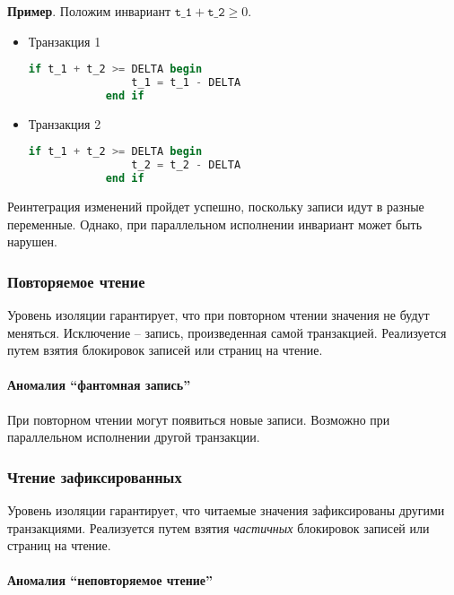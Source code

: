 \textbf{Пример}. Положим инвариант $\texttt{t\_1} + \texttt{t\_2} \geq 0$.

\begin{itemize}
    \item Транзакция 1
        \begin{lstlisting}[language=SQL]
            if t_1 + t_2 >= DELTA begin
                t_1 = t_1 - DELTA
            end if
        \end{lstlisting}
    \item Транзакция 2
    \begin{lstlisting}[language=SQL]
            if t_1 + t_2 >= DELTA begin
                t_2 = t_2 - DELTA
            end if
    \end{lstlisting}
\end{itemize}

Реинтеграция изменений пройдет успешно, поскольку записи идут в разные переменные. Однако, при
параллельном исполнении инвариант может быть нарушен.

\subsubsection{Повторяемое чтение}

Уровень изоляции гарантирует, что при повторном чтении значения не будут меняться. Исключение --
запись, произведенная самой транзакцией. Реализуется путем взятия блокировок записей или страниц на
чтение.

\paragraph{Аномалия ``фантомная запись''}

При повторном чтении могут появиться новые записи. Возможно при параллельном исполнении другой транзакции.

\subsubsection{Чтение зафиксированных}

Уровень изоляции гарантирует, что читаемые значения зафиксированы другими транзакциями. Реализуется
путем взятия \textit{частичных} блокировок записей или страниц на чтение.

\paragraph{Аномалия ``неповторяемое чтение''}

